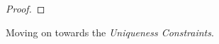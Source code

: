 \documentclass [11pt]{article}
\newcommand{\ra}{\rightarrow}
\newcommand{\tuple}[1]{\langle#1\rangle}
\newcommand{\lmove}{\leftarrow}
\newcommand{\rmove}{\rightarrow}
\newcommand{\stay}{-}
\newcommand{\sym}[3]{\textit{symbol}_{#1}[#2,#3]}
\newcommand{\cursor}[2]{\textit{cursor}[#1,#2]}
\newcommand{\state}[2]{\textit{state}_{#1}[#2]}
\newcommand{\sequ}[1]{\mathfrak{C}_{#1}}
\newcommand{\sequint}[2]{ \mathcal{#1}_{\mathfrak{C}_{#2}}}
\begin{document}
\begin{proof}
\end{proof}

Moving on towards the \emph{Uniqueness Constraints}.

%
%
\end{document}
